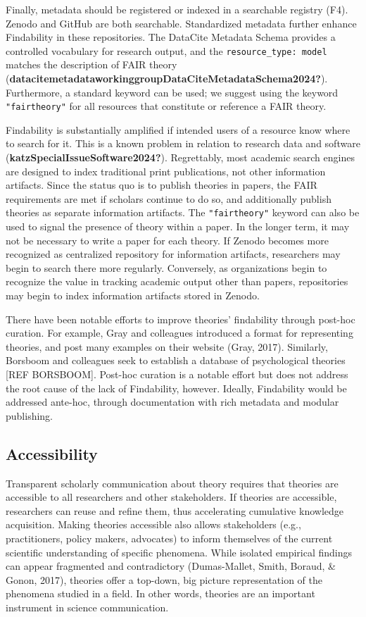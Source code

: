 \documentclass[
  man,floatsintext]{apa6}
\begin{document}
Finally, metadata should be registered or indexed in a searchable registry (F4).
Zenodo and GitHub are both searchable.
Standardized metadata further enhance Findability in these repositories.
The DataCite Metadata Schema provides a controlled vocabulary for research output, and the \texttt{resource\_type:\ model} matches the description of FAIR theory (\textbf{datacitemetadataworkinggroupDataCiteMetadataSchema2024?}).
Furthermore, a standard keyword can be used; we suggest using the keyword \texttt{"fairtheory"} for all resources that constitute or reference a FAIR theory.

Findability is substantially amplified if intended users of a resource know where to search for it.
This is a known problem in relation to research data and software (\textbf{katzSpecialIssueSoftware2024?}).
Regrettably, most academic search engines are designed to index traditional print publications, not other information artifacts.
Since the status quo is to publish theories in papers,
the FAIR requirements are met if scholars continue to do so,
and additionally publish theories as separate information artifacts.
The \texttt{"fairtheory"} keyword can also be used to signal the presence of theory within a paper.
In the longer term, it may not be necessary to write a paper for each theory.
If Zenodo becomes more recognized as centralized repository for information artifacts, researchers may begin to search there more regularly.
Conversely, as organizations begin to recognize the value in tracking academic output other than papers, repositories may begin to index information artifacts stored in Zenodo.

There have been notable efforts to improve theories' findability through post-hoc curation.
For example, Gray and colleagues introduced a format for representing theories,
and post many examples on their website (Gray, 2017).
Similarly, Borsboom and colleagues seek to establish a database of psychological theories {[}REF BORSBOOM{]}.
Post-hoc curation is a notable effort but does not address the root cause of the lack of Findability, however.
Ideally, Findability would be addressed ante-hoc, through documentation with rich metadata and modular publishing.

\subsection{Accessibility}\label{accessibility}

Transparent scholarly communication about theory requires that theories are accessible to all researchers and other stakeholders.
If theories are accessible, researchers can reuse and refine them,
thus accelerating cumulative knowledge acquisition.
Making theories accessible also allows stakeholders (e.g., practitioners, policy makers, advocates) to inform themselves of the current scientific understanding of specific phenomena.
While isolated empirical findings can appear fragmented and contradictory (Dumas-Mallet, Smith, Boraud, \& Gonon, 2017),
theories offer a top-down, big picture representation of the phenomena studied in a field.
In other words, theories are an important instrument in science communication.
\end{document}
